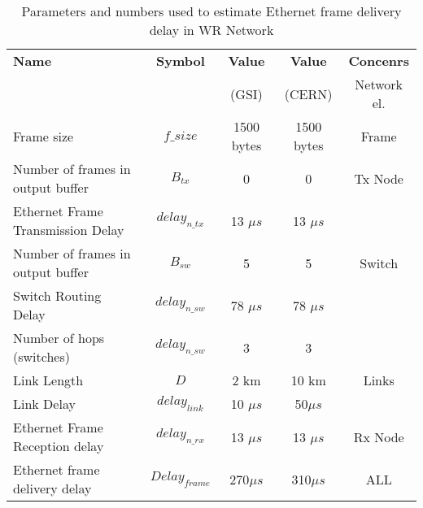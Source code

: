 \begin{table}[ht]
\caption{Parameters and numbers used to estimate Ethernet frame delivery delay
in WR Network} 
\centering
	\begin{tabular}{| l |  c | c | c | c |}          \hline
\textbf{Name}&\textbf{Symbol}&\textbf{Value}&\textbf{Value}&\textbf{ Concenrs} 
\\
                                 &                &  (GSI)&(CERN)   &Network el.
\\ \hline
Frame size                       & $f\_size$      &1500 bytes&1500 bytes&Frame
\\ \hline
Number of frames in output buffer& $B_{tx}$       &0         &0         &Tx Node
\\ \cline{0-3}
Ethernet Frame Transmission Delay& $delay_{n\_tx}$&13 $\mu s$&13 $\mu s$&      
 \\ \hline
Number of frames in output buffer& $B_{sw}$       &5         &5         &Switch
\\ \cline{0-3}
Switch Routing Delay             & $delay_{n\_sw}$&78 $\mu s$&78 $\mu s$&     
\\ \hline
Number of hops (switches)        & $delay_{n\_sw}$&3         &3         &   
\\ \hline
Link Length                      & $D$            &2 km      &10 km     & Links
\\ \cline{0-3}
Link Delay                       & $delay_{link}$ &10 $\mu s$&50$\mu s$&       
\\ \hline
Ethernet Frame Reception delay   & $delay_{n\_rx}$&13 $\mu s$&13 $\mu s$&Rx Node
\\ 
\hline
\hline
Ethernet frame delivery delay    & $Delay_{frame}$&270$\mu s$&310$\mu s$& ALL  
\\ \hline
\end{tabular}
\label{tab:EtherFrameDelayNumbers}
\end{table}
